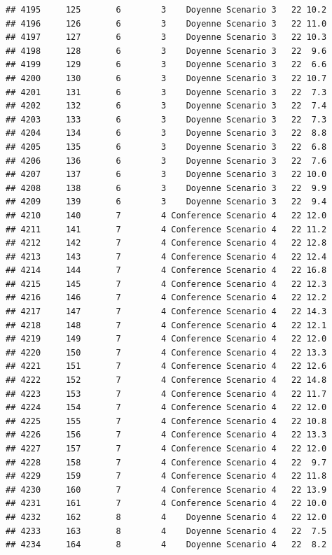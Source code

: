 \documentclass[
]{article}
\begin{document}
\begin{verbatim}
## 4195     125       6        3    Doyenne Scenario 3   22 10.2
## 4196     126       6        3    Doyenne Scenario 3   22 11.0
## 4197     127       6        3    Doyenne Scenario 3   22 10.3
## 4198     128       6        3    Doyenne Scenario 3   22  9.6
## 4199     129       6        3    Doyenne Scenario 3   22  6.6
## 4200     130       6        3    Doyenne Scenario 3   22 10.7
## 4201     131       6        3    Doyenne Scenario 3   22  7.3
## 4202     132       6        3    Doyenne Scenario 3   22  7.4
## 4203     133       6        3    Doyenne Scenario 3   22  7.3
## 4204     134       6        3    Doyenne Scenario 3   22  8.8
## 4205     135       6        3    Doyenne Scenario 3   22  6.8
## 4206     136       6        3    Doyenne Scenario 3   22  7.6
## 4207     137       6        3    Doyenne Scenario 3   22 10.0
## 4208     138       6        3    Doyenne Scenario 3   22  9.9
## 4209     139       6        3    Doyenne Scenario 3   22  9.4
## 4210     140       7        4 Conference Scenario 4   22 12.0
## 4211     141       7        4 Conference Scenario 4   22 11.2
## 4212     142       7        4 Conference Scenario 4   22 12.8
## 4213     143       7        4 Conference Scenario 4   22 12.4
## 4214     144       7        4 Conference Scenario 4   22 16.8
## 4215     145       7        4 Conference Scenario 4   22 12.3
## 4216     146       7        4 Conference Scenario 4   22 12.2
## 4217     147       7        4 Conference Scenario 4   22 14.3
## 4218     148       7        4 Conference Scenario 4   22 12.1
## 4219     149       7        4 Conference Scenario 4   22 12.0
## 4220     150       7        4 Conference Scenario 4   22 13.3
## 4221     151       7        4 Conference Scenario 4   22 12.6
## 4222     152       7        4 Conference Scenario 4   22 14.8
## 4223     153       7        4 Conference Scenario 4   22 11.7
## 4224     154       7        4 Conference Scenario 4   22 12.0
## 4225     155       7        4 Conference Scenario 4   22 10.8
## 4226     156       7        4 Conference Scenario 4   22 13.3
## 4227     157       7        4 Conference Scenario 4   22 12.0
## 4228     158       7        4 Conference Scenario 4   22  9.7
## 4229     159       7        4 Conference Scenario 4   22 11.8
## 4230     160       7        4 Conference Scenario 4   22 13.9
## 4231     161       7        4 Conference Scenario 4   22 10.0
## 4232     162       8        4    Doyenne Scenario 4   22 12.0
## 4233     163       8        4    Doyenne Scenario 4   22  7.5
## 4234     164       8        4    Doyenne Scenario 4   22  8.2

\end{verbatim}
\end{document}
